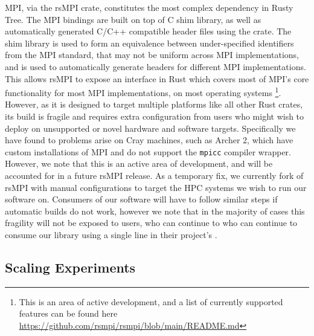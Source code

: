 MPI, via the rsMPI crate, constitutes the most complex dependency in Rusty Tree. The MPI bindings are built on top of C shim library, as well as automatically generated C/C++ compatible header files using the  crate. The shim library is used to form an equivalence between under-specified identifiers from the MPI standard, that may not be uniform across MPI implementations, and  is used to automatically generate headers for different MPI implementations. This allows rsMPI to expose an interface in Rust which covers most of MPI's core functionality for most MPI implementations, on most operating systems \footnote{This is an area of active development, and a list of currently supported features can be found here \url{https://github.com/rsmpi/rsmpi/blob/main/README.md}}. However, as it is designed to target multiple platforms like all other Rust crates, its build is fragile and requires extra configuration from users who might wish to deploy on unsupported or novel hardware and software targets. Specifically we have found to problems arise on Cray machines, such as Archer 2, which have custom installations of MPI and do not support the \texttt{mpicc} compiler wrapper. However, we note that this is an active area of development, and will be accounted for in a future rsMPI release. As a temporary fix, we currently fork of rsMPI with manual configurations to target the HPC systems we wish to run our software on. Consumers of our software will have to follow similar steps if automatic builds do not work, however we note that in the majority of cases this fragility will not be exposed to users, who can continue to who can continue to consume our library using a single line in their project's . 

\subsection*{Scaling Experiments}

